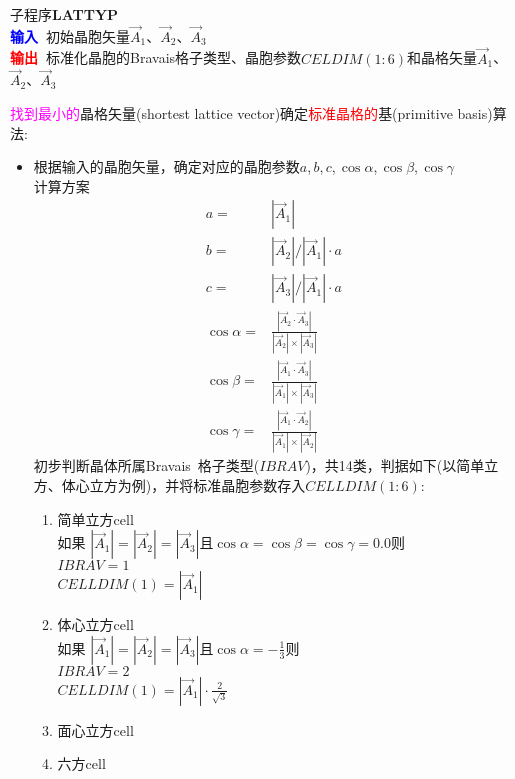 子程序\textbf{LATTYP}\\
\textbf{\textcolor{blue}{输入~}}初始晶胞矢量$\vec A_1$、$\vec A_2$、$\vec A_3$\\
\textbf{\textcolor{red}{输出~}}标准化晶胞的\textrm{Bravais}格子类型、晶胞参数$\mathit{CELDIM}(1:6)$和晶格矢量$\vec A_1$、$\vec A_2$、$\vec A_3$

\textcolor{magenta}{找到最小的}晶格矢量(\textrm{shortest lattice vector})确定\textcolor{red}{标准晶格的}基(\textrm{primitive basis})算法:~

\begin{itemize}
	\item 根据输入的晶胞矢量，确定对应的晶胞参数$a$,\,$b$,\,$c$,\,$\cos\alpha$,\,$\cos\beta$,\,$\cos\gamma$\\
		计算方案
		\begin{displaymath}
			\begin{aligned}
			a=&|\vec A_1|\\
			b=&|\vec A_2|/|\vec A_1|\cdot a\\
			c=&|\vec A_3|/|\vec A_1|\cdot a\\
			\cos\alpha=&\frac{|\vec A_2\cdot\vec A_3|}{|\vec A_2|\times|\vec A_3|}\\
			\cos\beta=&\frac{|\vec A_1\cdot\vec A_3|}{|\vec A_1|\times|\vec A_3|}\\
			\cos\gamma=&\frac{|\vec A_1\cdot\vec A_2|}{|\vec A_1|\times|\vec A_2|}
			\end{aligned}
			\label{eq:Cell_DM}
		\end{displaymath}
		初步判断晶体所属\textrm{Bravais~}格子类型($\mathit{IBRAV}$)，共14类，判据如下(以简单立方、体心立方为例)，并将标准晶胞参数存入$\mathit{CELLDIM}(1:6)$:~
		\begin{enumerate}
			\item 简单立方\textrm{cell}\\
				如果 $|\vec A_1|=|\vec A_2|=|\vec A_3|$且$\cos\alpha=\cos\beta=\cos\gamma=0.0$则\\
				$\mathit{IBRAV}=1$\\
				$\mathit{CELLDIM}(1)=|\vec A_1|$
			\item 体心立方\textrm{cell}\\
				如果 $|\vec A_1|=|\vec A_2|=|\vec A_3|$且$\cos\alpha=-\frac13$则\\
				$\mathit{IBRAV}=2$\\
				$\mathit{CELLDIM}(1)=|\vec A_1|\cdot\frac2{\sqrt3}$
			\item 面心立方\textrm{cell}
			\item 六方\textrm{cell}

\end{enumerate}
\end{itemize}
